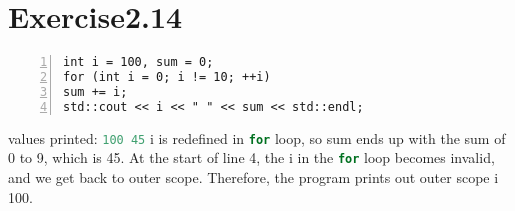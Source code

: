 \documentclass{article}
\begin{document}
    
\section*{Exercise2.14}

\begin{lstlisting}[numbers=left, basicstyle=\ttfamily, xleftmargin=2em]
int i = 100, sum = 0;
for (int i = 0; i != 10; ++i)
sum += i;
std::cout << i << " " << sum << std::endl;
\end{lstlisting}

\begin{flushleft}
values printed: \lstinline[language=C++]|100 45| \linebreak
i is redefined in \lstinline[language=C++]|for| loop, so sum ends up with the sum of 0 to 9, which is 45. At the start of line 4, the i in the \lstinline[language=C++]|for| loop becomes invalid, and we get back to outer scope. Therefore, the program prints out outer scope i 100.
\end{flushleft}
\end{document}
